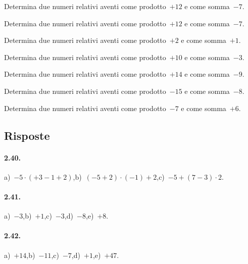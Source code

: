 \begin{multicols}{2}
\begin{esercizio}
 Determina due numeri relativi aventi come prodotto~$+12$ e come somma~$-7$.
\end{esercizio}

\begin{esercizio}
 Determina due numeri relativi aventi come
prodotto~$+12$ e come somma~$-7$.
\end{esercizio}

\begin{esercizio}
 Determina due numeri relativi aventi come
prodotto~$+2$ e come somma~$+1$.
\end{esercizio}

\begin{esercizio}
 Determina due numeri relativi aventi come
prodotto~$+10$ e come somma~$-3$.
\end{esercizio}

\begin{esercizio}
 Determina due numeri relativi aventi come
prodotto~$+14$ e come somma~$-9$.
\end{esercizio}

\begin{esercizio}
 Determina due numeri relativi aventi come
prodotto~$-15$ e come somma~$-8$.
\end{esercizio}

\begin{esercizio}
 Determina due numeri relativi aventi come
prodotto~$-7$ e come somma~$+6$.
\end{esercizio}
\end{multicols}
\subsection{Risposte}

\paragraph{2.40.}
a)~$-5\cdot(+3-1+2)$,\quad b)~$(-5+2)\cdot(-1)+2$,\quad c)~$-5+(7-3)\cdot2$.

\paragraph{2.41.}
a)~$-3$,\quad b)~$+1$,\quad c)~$-3$,\quad d)~$-8$,\quad e)~$+8$.

\paragraph{2.42.}
a)~$+14$,\quad b)~$-11$,\quad c)~$-7$,\quad d)~$+1$,\quad e)~$+47$.

